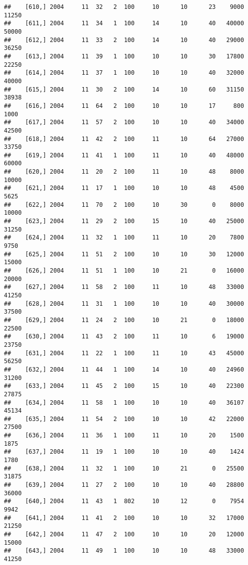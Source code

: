 \documentclass{article}\usepackage[]{graphicx}\usepackage[]{color}
\makeatletter
\newenvironment{kframe}{%
 \def\at@end@of@kframe{}%
 \ifinner\ifhmode%
  \def\at@end@of@kframe{\end{minipage}}%
  \begin{minipage}{\columnwidth}%
 \fi\fi%
 \def\FrameCommand##1{\hskip\@totalleftmargin \hskip-\fboxsep
 \colorbox{shadecolor}{##1}\hskip-\fboxsep
     \hskip-\linewidth \hskip-\@totalleftmargin \hskip\columnwidth}%
 \MakeFramed {\advance\hsize-\width
   \@totalleftmargin\z@ \linewidth\hsize
   \@setminipage}}%
 {\par\unskip\endMakeFramed%
 \at@end@of@kframe}
\newenvironment{knitrout}{}{} %
\makeatother
\begin{document}
\begin{knitrout}
\begin{kframe}
\begin{verbatim}
##    [610,] 2004     11  32   2  100     10      10      23    9000   11250
##    [611,] 2004     11  34   1  100     14      10      40   40000   50000
##    [612,] 2004     11  33   2  100     14      10      40   29000   36250
##    [613,] 2004     11  39   1  100     10      10      30   17800   22250
##    [614,] 2004     11  37   1  100     10      10      40   32000   40000
##    [615,] 2004     11  30   2  100     14      10      60   31150   38938
##    [616,] 2004     11  64   2  100     10      10      17     800    1000
##    [617,] 2004     11  57   2  100     10      10      40   34000   42500
##    [618,] 2004     11  42   2  100     11      10      64   27000   33750
##    [619,] 2004     11  41   1  100     11      10      40   48000   60000
##    [620,] 2004     11  20   2  100     11      10      48    8000   10000
##    [621,] 2004     11  17   1  100     10      10      48    4500    5625
##    [622,] 2004     11  70   2  100     10      30       0    8000   10000
##    [623,] 2004     11  29   2  100     15      10      40   25000   31250
##    [624,] 2004     11  32   1  100     11      10      20    7800    9750
##    [625,] 2004     11  51   2  100     10      10      30   12000   15000
##    [626,] 2004     11  51   1  100     10      21       0   16000   20000
##    [627,] 2004     11  58   2  100     11      10      48   33000   41250
##    [628,] 2004     11  31   1  100     10      10      40   30000   37500
##    [629,] 2004     11  24   2  100     10      21       0   18000   22500
##    [630,] 2004     11  43   2  100     11      10       6   19000   23750
##    [631,] 2004     11  22   1  100     11      10      43   45000   56250
##    [632,] 2004     11  44   1  100     14      10      40   24960   31200
##    [633,] 2004     11  45   2  100     15      10      40   22300   27875
##    [634,] 2004     11  58   1  100     10      10      40   36107   45134
##    [635,] 2004     11  54   2  100     10      10      42   22000   27500
##    [636,] 2004     11  36   1  100     11      10      20    1500    1875
##    [637,] 2004     11  19   1  100     10      10      40    1424    1780
##    [638,] 2004     11  32   1  100     10      21       0   25500   31875
##    [639,] 2004     11  27   2  100     10      10      40   28800   36000
##    [640,] 2004     11  43   1  802     10      12       0    7954    9942
##    [641,] 2004     11  41   2  100     10      10      32   17000   21250
##    [642,] 2004     11  47   2  100     10      10      20   12000   15000
##    [643,] 2004     11  49   1  100     10      10      48   33000   41250

\end{verbatim}
\end{kframe}
\end{knitrout}
\end{document}
